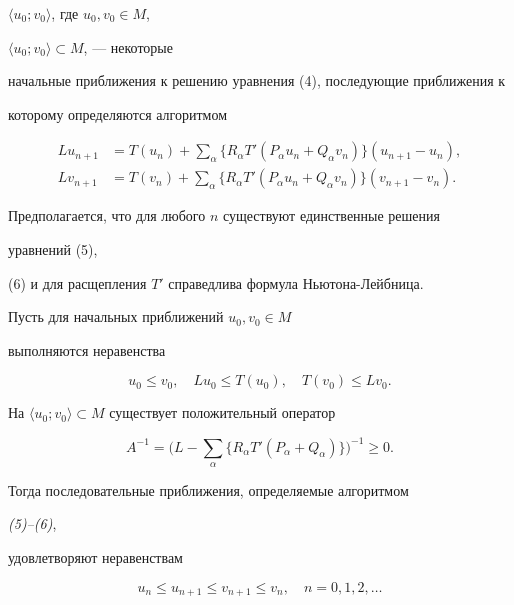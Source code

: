 $\langle u_0;v_0\rangle$, где $u_0,v_0\in M$,


$\langle u_0;v_0\rangle\subset M$, --- некоторые


начальные приближения к решению уравнения (4), последующие приближения к


которому определяются алгоритмом


\begin{align}


Lu_{n+1}&=T(u_n)+\sum_\alpha\{R_\alpha T'(P_\alpha u_n+


Q_\alpha v_n)\}(u_{n+1}-u_n), \\


Lv_{n+1}&=T(v_n)+\sum_\alpha\{R_\alpha T'(P_\alpha u_n+


Q_\alpha v_n)\}(v_{n+1}-v_n).


\end{align}


Предполагается, что для любого $n$ существуют единственные решения


уравнений (5),


(6) и для расщепления $T'$ справедлива формула Ньютона-Лейбница.





\begin{thm}


Пусть для начальных приближений $u_0,v_0\in M$


выполняются неравенства


\begin{equation}


u_0\le v_0,\quad Lu_0\le T(u_0),\quad T(v_0)\le Lv_0.


\end{equation}


На $\langle u_0;v_0\rangle\subset M$ существует положительный оператор


\begin{equation}


A^{-1}=\biggl(L-\sum_\alpha\{R_\alpha T'(P_\alpha+Q_\alpha)\}


\biggr)^{-1}\ge 0.


\end{equation}





Тогда последовательные приближения, определяемые алгоритмом


{\em (5)--(6)},


удовлетворяют неравенствам


\begin{equation}


u_n\le u_{n+1}\le v_{n+1}\le v_n,\quad


n=0,1,2,\dotsc


\end{equation}


\end{thm}





